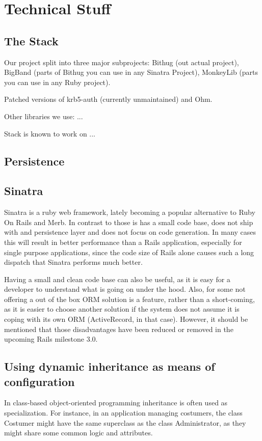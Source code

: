 \documentclass{llncs}
\begin{document}
\section{Technical Stuff}

\subsection{The Stack}
Our project split into three major subprojects: Bithug (out actual project), BigBand (parts of Bithug you can use in any Sinatra Project), MonkeyLib (parts you can use in any Ruby project).

Patched versions of krb5-auth (currently unmaintained) and Ohm.

Other libraries we use: ...

Stack is known to work on ...

\subsection{Persistence}


\subsection{Sinatra}
Sinatra is a ruby web framework\cite{sinatra:www}, lately becoming a popular alternative to Ruby On Rails and Merb.
In contrast to those is has a small code base, does not ship with and persistence layer and does not focus on code
generation. In many cases this will result in better performance than a Rails application, especially for single
purpose applications, since the code size of Rails alone causes such a long dispatch that Sinatra performs much better.

Having a small and clean code base can also be useful, as it is easy for a developer to understand what is going on under the hood.
Also, for some not offering a out of the box ORM solution is a feature, rather than a short-coming, as it is easier to
choose another solution if the system does not assume it is coping with its own ORM (ActiveRecord, in that case). However,
it should be mentioned that those disadvantages have been reduced or removed in the upcoming Rails milestone 3.0.

\subsection{Using dynamic inheritance as means of configuration}
In class-based object-oriented programming inheritance is often used as specialization.
For instance, in an application managing costumers, the class Costumer might have the same
superclass as the class Administrator, as they might share some common logic and attributes.
\end{document}
